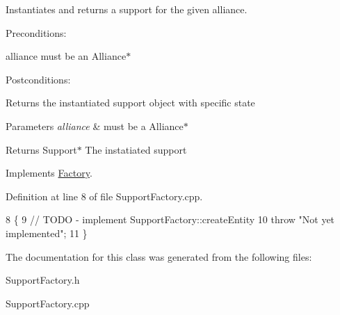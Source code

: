 Instantiates and returns a support for the given alliance. 

Preconditions\+:
\begin{DoxyItemize}
\item alliance must be an Alliance$\ast$
\end{DoxyItemize}

Postconditions\+:
\begin{DoxyItemize}
\item Returns the instantiated support object with specific state
\end{DoxyItemize}


\begin{DoxyParams}{Parameters}
{\em alliance} & must be a Alliance$\ast$ \\
\hline
\end{DoxyParams}
\begin{DoxyReturn}{Returns}
Support$\ast$ The instatiated support 
\end{DoxyReturn}


Implements \hyperlink{classFactory}{Factory}.



Definition at line 8 of file Support\+Factory.\+cpp.


\begin{DoxyCode}
8                                                         \{
9     \textcolor{comment}{// TODO - implement SupportFactory::createEntity}
10     \textcolor{keywordflow}{throw} \textcolor{stringliteral}{"Not yet implemented"};
11 \}
\end{DoxyCode}


The documentation for this class was generated from the following files\+:\begin{DoxyCompactItemize}
\item 
Support\+Factory.\+h\item 
Support\+Factory.\+cpp\end{DoxyCompactItemize}
